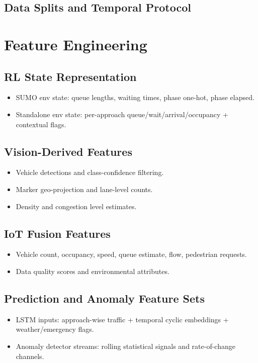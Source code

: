 \documentclass[conference]{IEEEtran}
\begin{document}
\subsection{Data Splits and Temporal Protocol}

\section{Feature Engineering}
\subsection{RL State Representation}
\begin{itemize}[leftmargin=*]
	\item SUMO env state: queue lengths, waiting times, phase one-hot, phase elapsed.
	\item Standalone env state: per-approach queue/wait/arrival/occupancy + contextual flags.
\end{itemize}

\subsection{Vision-Derived Features}
\begin{itemize}[leftmargin=*]
	\item Vehicle detections and class-confidence filtering.
	\item Marker geo-projection and lane-level counts.
	\item Density and congestion level estimates.
\end{itemize}

\subsection{IoT Fusion Features}
\begin{itemize}[leftmargin=*]
	\item Vehicle count, occupancy, speed, queue estimate, flow, pedestrian requests.
	\item Data quality scores and environmental attributes.
\end{itemize}

\subsection{Prediction and Anomaly Feature Sets}
\begin{itemize}[leftmargin=*]
	\item LSTM inputs: approach-wise traffic + temporal cyclic embeddings + weather/emergency flags.
	\item Anomaly detector streams: rolling statistical signals and rate-of-change channels.
\end{itemize}
\end{document}
